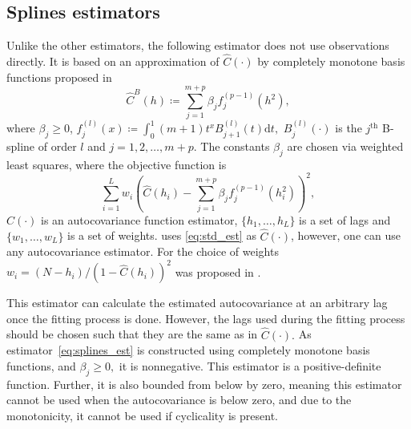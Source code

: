 \subsection{Splines estimators}
Unlike the other estimators, the following estimator does not use observations directly. It is based on an approximation of \(\widehat{C}(\cdot)\) by completely monotone basis functions proposed in \cite{Choi2013} \\[-2mm]
\begin{equation} \label{eq:splines_est}
    \widehat{C}^{B}(h) \coloneq \sum_{j=1}^{m + p} \beta_{j} f_{j}^{(p - 1)} \left(h^{2}\right) ,
\end{equation}
where \(\beta_{j} \geq 0\), \(f_{j}^{(l)} (x) \coloneq \int_{0}^{1} (m + 1) t^{x} B_{j + 1}^{(l)} (t) \text{d} t, \) \(B_{j}^{(l)}(\cdot)\) is the \(j^{\text{th}}\) B-spline of order \(l\) and \(j = 1, 2, \dots , m + p \).
The constants \(\beta_{j}\) are chosen via weighted least squares, where the objective function is
\[
\sum_{i = 1}^{L} w_{i} \left( \widehat{C}(h_{i}) - \sum_{j=1}^{m + p} \beta_{j} f_{j}^{(p - 1)} \left(h_{i}^{2}\right) \right)^{2} ,
\]
\(\widehat{C}(\cdot)\) is an autocovariance function estimator, \(\{ h_{1} , \dots , h_{L} \}\) is a set of lags and \(\{ w_{1}, \dots , w_{L} \}\) is a set of weights. \cite{Choi2013} uses \eqref{eq:std_est} as \(\widehat{C}(\cdot)\), however, one can use any autocovariance estimator. For the choice of weights \(w_{i} = \left(N-h_{i}\right) / \left(1 - \widehat{C}(h_{i})\right)^{2} \) was proposed in \cite{Cressie1985}.

This estimator can calculate the estimated autocovariance at an arbitrary lag once the fitting process is done. However, the lags used during the fitting process should be chosen such that they are the same as in \(\widehat{C}(\cdot).\)
As estimator~\eqref{eq:splines_est} is constructed using completely monotone basis functions, and \(\beta_{j} \geq 0,\) it is nonnegative. This estimator is a positive-definite function. Further, it is also bounded from below by zero, meaning this estimator cannot be used when the autocovariance is below zero, and due to the monotonicity, it cannot be used if cyclicality is present.

